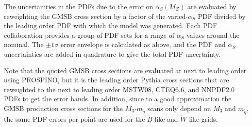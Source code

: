 \documentclass[dissertation.tex]{subfiles}
\begin{document}
The uncertainties in the PDFs due to the error on $\alpha_{S}(M_{Z})$ are evaluated by reweighting the GMSB cross section by a factor of the varied-$\alpha_{S}$ PDF divided by the leading order PDF with which the model was generated.  Each PDF collaboration provides a group of PDF sets for a range of $\alpha_{S}$ values around the nominal.  The $\pm1\sigma$ error envelope is calculated as above, and the PDF and $\alpha_{S}$ uncertainties are added in quadrature to give the total PDF uncertainty.

Note that the quoted GMSB cross sections are evaluated at next to leading order using PROSPINO, but it is the leading order Pythia cross sections that are reweighted to the next to leading order MSTW08, CTEQ6.6, and NNPDF2.0 PDFs to get the error bands.  In addition, since to a good approximation the GMSB production cross sections for the $M_{3}$-$m_{\tilde{q}}$ scans only depend on $M_{3}$ and $m_{\tilde{q}}$, the same PDF errors per point are used for the $\tilde{B}$-like and $\tilde{W}$-like grids.



\end{document}
